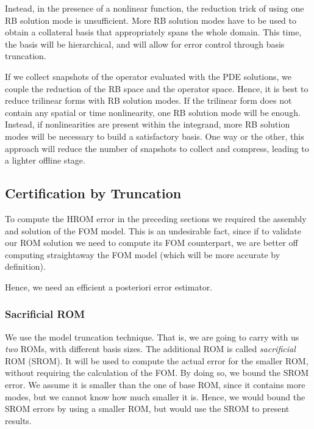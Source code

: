 \documentclass[../../thesis.tex]{subfiles}
\begin{document}
Instead, in the presence of a nonlinear function,
the reduction trick of using one RB solution mode is unsufficient.
More RB solution modes have to be used to obtain 
a collateral basis that appropriately spans the whole domain.
This time, the basis will be hierarchical, 
and will allow for error control through basis truncation.

If we collect snapshots of the operator evaluated with the PDE solutions,
we couple the reduction of the RB space and the operator space.
Hence, it is best to reduce trilinear forms with RB solution modes.
If the trilinear form does not contain any spatial or time nonlinearity, 
one RB solution mode will be enough.
Instead, if nonlinearities are present within the integrand, more RB solution modes will be necessary 
to build a satisfactory basis.
One way or the other, this approach will reduce the number of snapshots to collect and compress,
leading to a lighter offline stage.

\newpage
\subsection{Certification by Truncation}
\label{sec:hrom_results_posteriori_error_estimation}
To compute the HROM error in the preceding sections
we required the assembly and solution of the FOM model.
This is an undesirable fact, since if to validate our ROM solution
we need to compute its FOM counterpart, 
we are better off computing straightaway the FOM model 
(which will be more accurate by definition).

Hence, we need an efficient a posteriori error estimator.

\subsubsection{Sacrificial ROM}
We use the model truncation technique.
That is, we are going to carry with us \textit{two} ROMs,
with different basis sizes.
The additional ROM is called \textit{sacrificial} ROM (SROM).
It will be used to compute the actual error for the smaller ROM,
without requiring the calculation of the FOM.
By doing so, we bound the SROM error.
We assume it is smaller than the one of base ROM, since it contains more modes,
but we cannot know how much smaller it is.
Hence, we would bound the SROM errors by using a smaller ROM, 
but would use the SROM to present results.
\end{document}
